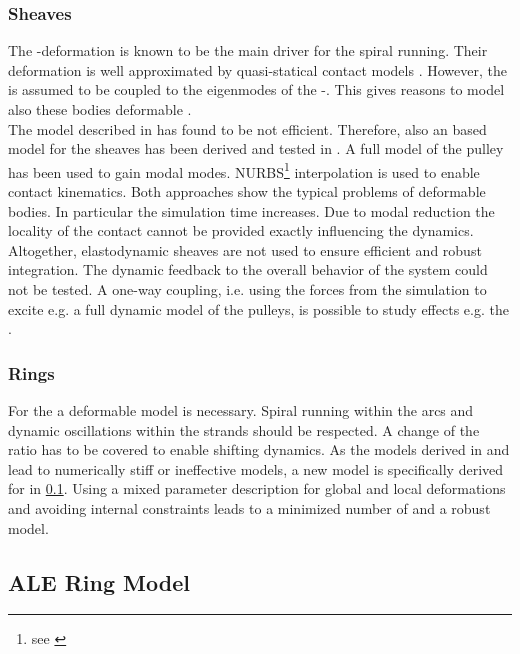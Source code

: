 \subsubsection{Sheaves}
%
The \pulley-\sheave deformation is known to be the main driver for the spiral running.
Their deformation is well approximated by quasi-statical contact models \cite{cebulla_spatial_2014}.
However, the \EIN is assumed to be coupled to the eigenmodes of the \pulley-\sheaves.
This gives reasons to model also these bodies deformable \cite{van_der_noll_gerauschoptimierung_2015}.\\
The \sheave model described in \cite{schindler_spatial_2010} has found to be not efficient.
Therefore, also an \FFR based model for the sheaves has been derived and tested in \cite{wang_framework_2014}.
A full \FEM model of the pulley has been used to gain modal modes.
NURBS\footnote{see \cite{piegl_nurbs_1997}} interpolation is used to enable contact kinematics.
Both approaches show the typical problems of deformable bodies.
In particular the simulation time increases.
Due to modal reduction the locality of the contact cannot be provided exactly influencing the dynamics.\\
Altogether, elastodynamic sheaves are not used to ensure efficient and robust integration.
The dynamic feedback to the overall behavior of the system could not be tested.
A one-way coupling, i.e. using the forces from the simulation to excite e.g. a full dynamic \FE model of the pulleys, is possible to study effects e.g. the \EIN.
%
\subsubsection{Rings}
%
For the \rings a deformable model is necessary.
Spiral running within the arcs and dynamic oscillations within the strands should be respected.
A change of the ratio has to be covered to enable shifting dynamics.
As the \ring models derived in \cite{schindler_spatial_2010} and \cite{cebulla_spatial_2014} lead to numerically stiff or ineffective models, a new \ring model is specifically derived for \CVTs in \cref{subsec:ALERing}.
Using a mixed parameter description for global and local deformations and avoiding internal constraints leads to a minimized number of \DOFs and a robust model.\par

\subsection{ALE Ring Model} \label{subsec:ALERing}

